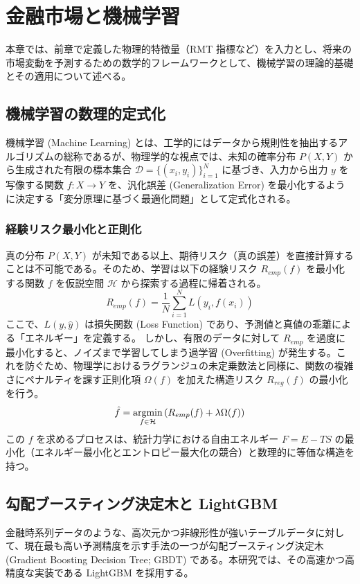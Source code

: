 \documentclass[11pt,a4paper,oneside]{ltjsarticle}
\begin{document}
\clearpage
\section{金融市場と機械学習}
本章では、前章で定義した物理的特徴量（RMT 指標など）を入力とし、将来の市場変動を予測するための数学的フレームワークとして、機械学習の理論的基礎とその適用について述べる。

\subsection{機械学習の数理的定式化}
機械学習 (Machine Learning) とは、工学的にはデータから規則性を抽出するアルゴリズムの総称であるが、物理学的な視点では、未知の確率分布 $P(X,Y)$ から生成された有限の標本集合 $\mathcal{D}=\{(x_{i},y_{i})\}_{i=1}^{N}$ に基づき、入力から出力 $y$ を写像する関数 $f:X\rightarrow Y$ を、汎化誤差 (Generalization Error) を最小化するように決定する「変分原理に基づく最適化問題」として定式化される。

\subsubsection{経験リスク最小化と正則化}
真の分布 $P(X,Y)$ が未知である以上、期待リスク（真の誤差）を直接計算することは不可能である。そのため、学習は以下の経験リスク $R_{emp}(f)$ を最小化する関数 $f$ を仮説空間 $\mathcal{H}$ から探索する過程に帰着される。
\begin{equation}
R_{emp}(f) = \frac{1}{N} \sum_{i=1}^{N} L(y_{i}, f(x_{i}))
\end{equation}
ここで、$L(y, \hat{y})$ は損失関数 (Loss Function) であり、予測値と真値の乖離による「エネルギー」を定義する。
しかし、有限のデータに対して $R_{emp}$ を過度に最小化すると、ノイズまで学習してしまう過学習 (Overfitting) が発生する。これを防ぐため、物理学におけるラグランジュの未定乗数法と同様に、関数の複雑さにペナルティを課す正則化項 $\Omega(f)$ を加えた構造リスク $R_{reg}(f)$ の最小化を行う。
\begin{equation}
\hat{f} = \mathop{\rm argmin}_{f \in \mathcal{H}} \left( R_{emp}(f) + \lambda \Omega(f) \right)
\end{equation}
この $f$ を求めるプロセスは、統計力学における自由エネルギー $F = E - TS$ の最小化（エネルギー最小化とエントロピー最大化の競合）と数理的に等価な構造を持つ。

\subsection{勾配ブースティング決定木と LightGBM}
金融時系列データのような、高次元かつ非線形性が強いテーブルデータに対して、現在最も高い予測精度を示す手法の一つが勾配ブースティング決定木 (Gradient Boosting Decision Tree; GBDT) である。本研究では、その高速かつ高精度な実装である LightGBM を採用する。
\end{document}
